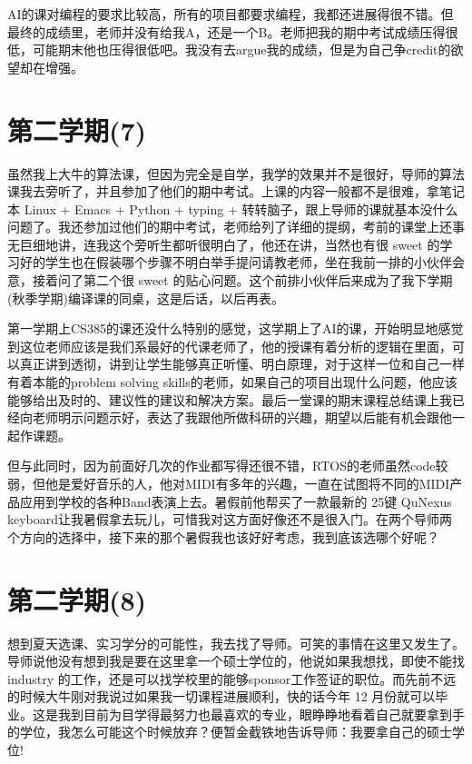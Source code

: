 \documentclass[12pt]{book}
\begin{document}
AI的课对编程的要求比较高，所有的项目都要求编程，我都还进展得很不错。但最终的成绩里，老师并没有给我A，还是一个B。老师把我的期中考试成绩压得很低，可能期末他也压得很低吧。我没有去argue我的成绩，但是为自己争credit的欲望却在增强。 

\section{第二学期(7)}
\label{sec-4-7}

虽然我上大牛的算法课，但因为完全是自学，我学的效果并不是很好，导师的算法课我去旁听了，并且参加了他们的期中考试。上课的内容一般都不是很难，拿笔记本 Linux + Emacs + Python + typing + 转转脑子，跟上导师的课就基本没什么问题了。我还参加过他们的期中考试，老师给列了详细的提纲，考前的课堂上还事无巨细地讲，连我这个旁听生都听很明白了，他还在讲，当然也有很 sweet 的学习好的学生也在假装哪个步骤不明白举手提问请教老师，坐在我前一排的小伙伴会意，接着问了第二个很 sweet 的贴心问题。这个前排小伙伴后来成为了我下学期(秋季学期)编译课的同桌，这是后话，以后再表。

第一学期上CS385的课还没什么特别的感觉，这学期上了AI的课，开始明显地感觉到这位老师应该是我们系最好的代课老师了，他的授课有着分析的逻辑在里面，可以真正讲到透彻，讲到让学生能够真正听懂、明白原理，对于这样一位和自己一样有着本能的problem solving skills的老师，如果自己的项目出现什么问题，他应该能够给出及时的、建议性的建议和解决方案。最后一堂课的期末课程总结课上我已经向老师明示问题示好，表达了我跟他所做科研的兴趣，期望以后能有机会跟他一起作课题。

但与此同时，因为前面好几次的作业都写得还很不错，RTOS的老师虽然code较弱，但他是爱好音乐的人，他对MIDI有多年的兴趣，一直在试图将不同的MIDI产品应用到学校的各种Band表演上去。暑假前他帮买了一款最新的 25键 QuNexus keyboard让我暑假拿去玩儿，可惜我对这方面好像还不是很入门。在两个导师两个方向的选择中，接下来的那个暑假我也该好好考虑，我到底该选哪个好呢？

\section{第二学期(8)}
\label{sec-4-8}

想到夏天选课、实习学分的可能性，我去找了导师。可笑的事情在这里又发生了。导师说他没有想到我是要在这里拿一个硕士学位的，他说如果我想找，即使不能找industry 的工作，还是可以找学校里的能够sponsor工作签证的职位。而先前不远的时候大牛刚对我说过如果我一切课程进展顺利，快的话今年 12 月份就可以毕业。这是我到目前为目学得最努力也最喜欢的专业，眼睁睁地看着自己就要拿到手的学位，我怎么可能这个时候放弃？便暂金截铁地告诉导师：我要拿自己的硕士学位! 
\end{document}
